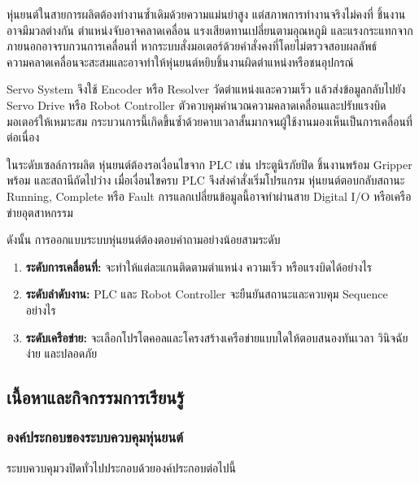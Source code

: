 หุ่นยนต์ในสายการผลิตต้องทำงานซ้ำเดิมด้วยความแม่นยำสูง แต่สภาพการทำงานจริงไม่คงที่ ชิ้นงานอาจมีมวลต่างกัน ตำแหน่งจับอาจคลาดเคลื่อน แรงเสียดทานเปลี่ยนตามอุณหภูมิ และแรงกระแทกจากภายนอกอาจรบกวนการเคลื่อนที่ หากระบบสั่งมอเตอร์ด้วยคำสั่งคงที่โดยไม่ตรวจสอบผลลัพธ์ ความคลาดเคลื่อนจะสะสมและอาจทำให้หุ่นยนต์หยิบชิ้นงานผิดตำแหน่งหรือชนอุปกรณ์

Servo System จึงใช้ Encoder หรือ Resolver วัดตำแหน่งและความเร็ว แล้วส่งข้อมูลกลับไปยัง Servo Drive หรือ Robot Controller ตัวควบคุมคำนวณความคลาดเคลื่อนและปรับแรงบิดมอเตอร์ให้เหมาะสม กระบวนการนี้เกิดขึ้นซ้ำด้วยคาบเวลาสั้นมากจนผู้ใช้งานมองเห็นเป็นการเคลื่อนที่ต่อเนื่อง

ในระดับเซลล์การผลิต หุ่นยนต์ต้องรอเงื่อนไขจาก PLC เช่น ประตูนิรภัยปิด ชิ้นงานพร้อม Gripper พร้อม และสถานีถัดไปว่าง เมื่อเงื่อนไขครบ PLC จึงส่งคำสั่งเริ่มโปรแกรม หุ่นยนต์ตอบกลับสถานะ Running, Complete หรือ Fault การแลกเปลี่ยนข้อมูลนี้อาจทำผ่านสาย Digital I/O หรือเครือข่ายอุตสาหกรรม

ดังนั้น การออกแบบระบบหุ่นยนต์ต้องตอบคำถามอย่างน้อยสามระดับ

\begin{enumerate}
    \item \textbf{ระดับการเคลื่อนที่:} จะทำให้แต่ละแกนติดตามตำแหน่ง ความเร็ว หรือแรงบิดได้อย่างไร
    \item \textbf{ระดับลำดับงาน:} PLC และ Robot Controller จะยืนยันสถานะและควบคุม Sequence อย่างไร
    \item \textbf{ระดับเครือข่าย:} จะเลือกโปรโตคอลและโครงสร้างเครือข่ายแบบใดให้ตอบสนองทันเวลา วินิจฉัยง่าย และปลอดภัย
\end{enumerate}



\subsection{เนื้อหาและกิจกรรมการเรียนรู้}

\subsubsection{องค์ประกอบของระบบควบคุมหุ่นยนต์}

ระบบควบคุมวงปิดทั่วไปประกอบด้วยองค์ประกอบต่อไปนี้

